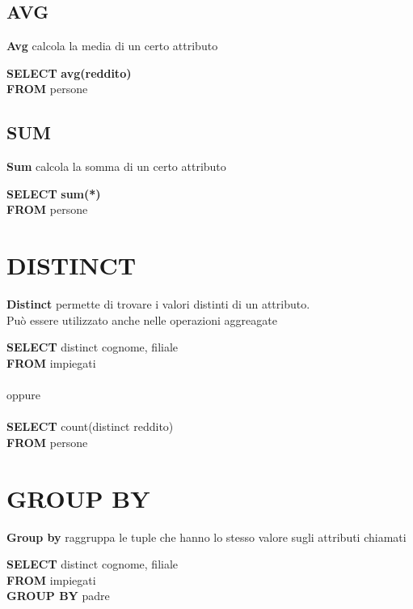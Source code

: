 \documentclass[12pt, a4paper]{article}
\begin{document}
\begin{frame}
			\subsection{AVG}
				\textbf{Avg} 
					calcola la media di un certo attributo
					\begin{center}
					\justifying
					\textbf{SELECT} \textbf{avg(reddito)} \\
		 			\textbf{FROM} persone \\
					\end{center} 

			\subsection{SUM}
				\textbf{Sum} calcola la somma di un certo attributo
					\begin{center}
					\justifying
					\textbf{SELECT} \textbf{sum(*)} \\
		 			\textbf{FROM} persone \\
					\end{center} 

		

		\section{DISTINCT}
			\textbf{Distinct} permette di trovare i valori distinti di un attributo. \\
Può essere utilizzato anche nelle operazioni aggreagate
				\begin{center}
				\justifying
				\textbf{SELECT} distinct cognome, filiale\\
	 			\textbf{FROM} impiegati \\
				\\oppure \\ \\
				\textbf{SELECT} count(distinct reddito)\\
	 			\textbf{FROM} persone \\
				\end{center} 

		\section{GROUP BY}
			\textbf{Group by} raggruppa le tuple che hanno lo stesso valore sugli attributi chiamati
			\begin{center}
				\justifying
				\textbf{SELECT} distinct cognome, filiale\\
	 			\textbf{FROM} impiegati \\
				\textbf{GROUP BY} padre 
			\end{center}


\end{frame}
\end{document}
